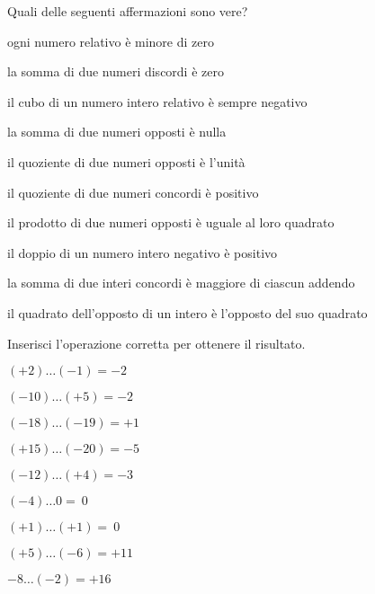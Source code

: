 \pagebreak %

\begin{esercizio}
Quali delle seguenti affermazioni sono vere?
\TabPositions{110mm}
\begin{enumeratees}
 \item ogni numero relativo è minore di zero \tab\verofalso
 \item la somma di due numeri discordi è zero \tab\verofalso
 \item il cubo di un numero intero relativo è sempre negativo 
\tab\verofalso
 \item la somma di due numeri opposti è nulla \tab\verofalso
 \item il quoziente di due numeri opposti è l'unità \tab\verofalso
 \item il quoziente di due numeri concordi è positivo \tab\verofalso
 \item il prodotto di due numeri opposti è uguale al loro quadrato 
\tab\verofalso
 \item il doppio di un numero intero negativo è positivo \tab\verofalso
 \item la somma di due interi concordi è maggiore di ciascun addendo 
\tab\verofalso
 \item il quadrato dell'opposto di un intero è l'opposto del suo quadrato 
\tab\verofalso
\end{enumeratees}
\end{esercizio}

\begin{esercizio}
Inserisci l'operazione corretta per ottenere il risultato.

\vspace{-.5em}
 \begin{htmulticols}{3}
 \begin{enumeratees}
 \item \((+2)\ldots(-1) = -2\)
 \item \((-10)\ldots(+5) = -2\)
 \item \((-18)\ldots(-19) = +1\)
 \item \((+15)\ldots(-20) = -5\)
 \item \((-12)\ldots(+4) = -3\)
 \item \((-4)\ldots0 =~0\)
 \item \((+1)\ldots(+1) =~0\)
 \item \((+5)\ldots(-6) = +11\)
 \item \(-8\ldots(-2) = +16\)
 \end{enumeratees}
 \end{htmulticols}
\end{esercizio}


